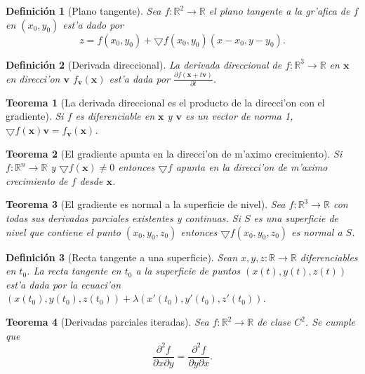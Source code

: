 \documentclass[a4paper,spanish]{article}
\newcommand{\R}[0]{\mathbb{R}}
\newcommand{\xx}[0]{\mathbf{x}}
\newcommand{\parcial}[2]{\frac{\partial #1}{\partial #2}}
\newcommand{\grad}[0]{\bigtriangledown}
\newtheorem{teo}{Teorema}
\newtheorem{defi}{Definici\'on}
\begin{document}
\begin{defi}[Plano tangente]
\label{def-plano-tangente}
Sea $f : \R^2 \to \R$ el \emph{plano tangente} a la gr'afica de $f$ en 
$(x_0,y_0)$ est'a dado por
$$z = f(x_0,y_0) + \grad f (x_0,y_0) (x - x_0, y - y_0).$$
\end{defi}

\begin{defi}[Derivada direccional]
\label{def-derivada-direccional}
La \emph{derivada direccional} de $f : \R^3 \to \R$ en $\xx$ en direcci'on
$\mathbf{v}$ $f_\mathbf{v}(\xx)$ est'a dada por
$\parcial{f(\xx + t \mathbf{v})}{t}$.
\end{defi}

\begin{teo}[La derivada direccional es el producto de la direcci'on con el
gradiente]
\label{teo-derivada-direccional-gradiente}
Si $f$ es diferenciable en $\xx$ y $\mathbf{v}$ es un vector de norma 1, 
$\grad f(\xx)\mathbf{v} = f_\mathbf{v}(\xx)$.
\end{teo}

\begin{teo}[El gradiente apunta en la direcci'on de m'aximo crecimiento]
\label{teo-maximo-crecimiento}
Si $f : \R^n \to \R$ y $\grad f(\xx) \neq 0$ entonces $\grad f$ apunta en la
direcci'on de m'aximo crecimiento de $f$ desde $\xx$.
\end{teo}

\begin{teo}[El gradiente es normal a la superficie de nivel]
\label{teo-gradiente-normal}
Sea $f : \R^3 \to \R$ con todas sus derivadas parciales existentes y continuas. 
Si $S$ es una superficie de nivel que contiene el punto $(x_0,y_0,z_0)$ 
entonces $\grad f(x_0,y_0,z_0)$ es normal a $S$.
\end{teo}

\begin{defi}[Recta tangente a una superficie]
\label{defi-recta-tangente-superficie}
Sean $x,y,z : \R \to \R$ diferenciables en $t_0$. La \emph{recta tangente}
en $t_0$ a la superficie de puntos $(x(t),y(t),z(t))$ est'a dada por la 
ecuaci'on $(x(t_0),y(t_0),z(t_0)) + \lambda (x'(t_0),y'(t_0),z'(t_0))$.
\end{defi}

\begin{teo}[Derivadas parciales iteradas]
\label{teo-parciales-iteradas}
Sea $f : \R^2 \to \R$ de clase $C^2$. Se cumple que
$$\parcial{^2 f}{x \partial y} = \parcial{^2 f}{y \partial x}.$$
\end{teo}
\end{document}

